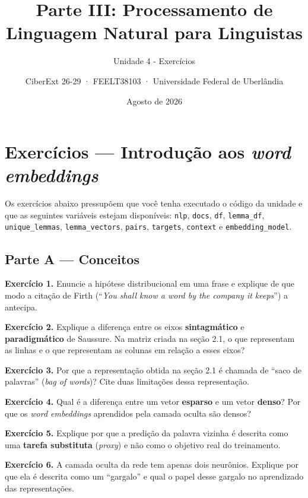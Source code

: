 \documentclass[
  brazilian,
]{article}
\title{Parte III: Processamento de Linguagem Natural para Linguistas}
\subtitle{Unidade 4 - Exercícios}
\author{CiberExt 26-29 · FEELT38103 · Universidade Federal de
Uberlândia}
\date{Agosto de 2026}
\begin{document}
\maketitle

\hypertarget{exercuxedcios-introduuxe7uxe3o-aos-word-embeddings}{%
\section{\texorpdfstring{Exercícios --- Introdução aos \emph{word
embeddings}}{Exercícios --- Introdução aos word embeddings}}\label{exercuxedcios-introduuxe7uxe3o-aos-word-embeddings}}

Os exercícios abaixo pressupõem que você tenha executado o código da
unidade e que as seguintes variáveis estejam disponíveis: \texttt{nlp},
\texttt{docs}, \texttt{df}, \texttt{lemma\_df}, \texttt{unique\_lemmas},
\texttt{lemma\_vectors}, \texttt{pairs}, \texttt{targets},
\texttt{context} e \texttt{embedding\_model}.

\hypertarget{parte-a-conceitos}{%
\subsection{Parte A --- Conceitos}\label{parte-a-conceitos}}

\textbf{Exercício 1.} Enuncie a hipótese distribucional em uma frase e
explique de que modo a citação de Firth (``\emph{You shall know a word
by the company it keeps}'') a antecipa.

\textbf{Exercício 2.} Explique a diferença entre os eixos
\textbf{sintagmático} e \textbf{paradigmático} de Saussure. Na matriz
criada na seção 2.1, o que representam as linhas e o que representam as
colunas em relação a esses eixos?

\textbf{Exercício 3.} Por que a representação obtida na seção 2.1 é
chamada de ``saco de palavras'' (\emph{bag of words})? Cite duas
limitações dessa representação.

\textbf{Exercício 4.} Qual é a diferença entre um vetor \textbf{esparso}
e um vetor \textbf{denso}? Por que os \emph{word embeddings} aprendidos
pela camada oculta são densos?

\textbf{Exercício 5.} Explique por que a predição da palavra vizinha é
descrita como uma \textbf{tarefa substituta} (\emph{proxy}) e não como o
objetivo real do treinamento.

\textbf{Exercício 6.} A camada oculta da rede tem apenas dois neurônios.
Explique por que ela é descrita como um ``gargalo'' e qual o papel desse
gargalo no aprendizado das representações.
\end{document}
